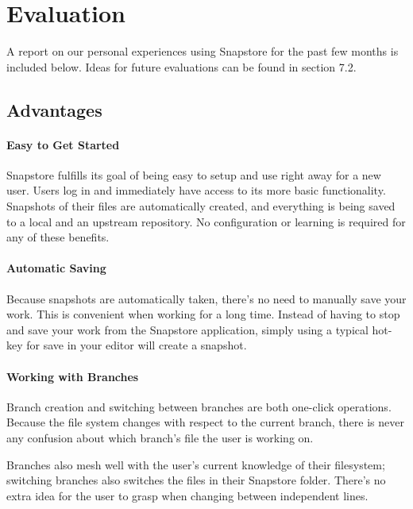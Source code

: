 \chapter{Evaluation}

A report on our personal experiences using Snapstore for the past few months is included below. Ideas for future evaluations can be found in section 7.2.

\section{Advantages}

\subsubsection{Easy to Get Started}

Snapstore fulfills its goal of being easy to setup and use right away for a new user. Users log in and immediately have access to its more basic functionality. Snapshots of their files are automatically created, and everything is being saved to a local and an upstream repository. No configuration or learning is required for any of these benefits. 

\subsubsection{Automatic Saving}

Because snapshots are automatically taken, there's no need to manually save your work. This is convenient when working for a long time. Instead of having to stop and save your work from the Snapstore application, simply using a typical hot-key for save in your editor will create a snapshot.

\subsubsection{Working with Branches}

Branch creation and switching between branches are both one-click operations. Because the file system changes with respect to the current branch, there is never any confusion about which branch's file the user is working on.

Branches also mesh well with the user's current knowledge of their filesystem; switching branches also switches the files in their Snapstore folder. There's no extra idea for the user to grasp when changing between independent lines. 

